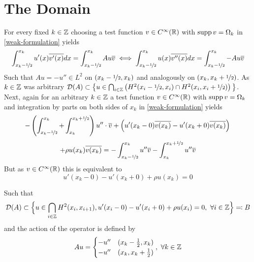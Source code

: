 \chapter{The Domain}

For every fixed $k \in \mathbb{Z}$ choosing a test function $v \in C^{\infty}(\mathbb{R})$ with $\operatorname{supp} v = \Omega_{k}$  in \eqref{weak-formulation} yields
	\[ \int_{x_{k}-\nicefrac{1}{2}}^{x_{k}} u'(x) \overline{v'(x)} dx = \int_{x_{k}-\nicefrac{1}{2}}^{x_{k}} A u \overline{v} \iff \int_{x_{k}-\nicefrac{1}{2}}^{x_{k}} u(x) \overline{v''(x)} dx = \int_{x_{k}-\nicefrac{1}{2}}^{x_{k}} - A u \overline{v} \]
Such that $A u = - u'' \in L^{2}$ on $(x_{k} -\nicefrac{1}{2}, x_{k})$ and analogously on $(x_{k}, x_{k} + \nicefrac{1}{2})$.
As $k \in \mathbb{Z}$ was arbitrary $\mathcal{D}(A) \subset \big\{ u \in \bigcap_{i \in \mathbb{Z}} \left( H^{2}(x_{i}-\nicefrac{1}{2}, x_{i}) \cap H^{2}(x_{i}, x_{i} + \nicefrac{1}{2}) \right)\big\}$. \\

Next, again for an arbitrary $k \in \mathbb{Z}$ a test function $v \in C^{\infty}(\mathbb{R})$ with $\operatorname{supp} v = \Omega_{k}$ and integration by parts on both sides of $x_{k}$ in \eqref{weak-formulation} yields
	\[ -\left( \int_{x_{k}-\nicefrac{1}{2}}^{x_{k}} + \int_{x_{k}}^{x_{k} + \nicefrac{1}{2}}\right) u'' \cdot \overline{v} + \left( u'(x_{k}-0) \overline{v(x_{k})} - u'(x_{k} + 0) \overline{v(x_{k})} \right) \\ \]
	\[ +  \rho u(x_{k})\overline{v(x_{k})} = - \int_{x_{k} - \nicefrac{1}{2}}^{x_{k}} u'' \overline{v} - \int_{x_{k}}^{x_{k} + \nicefrac{1}{2}} u'' \overline{v} \]
But as $v \in C^{\infty}(\mathbb{R})$ this is equivalent to
	\[ u'(x_{k}-0) - u'(x_{k}+0) + \rho u(x_{k}) = 0 \]
	
Such that
	\begin{align*}
		\mathcal{D}(A) \subset \Big\{ u \in \bigcap_{i \in \mathbb{Z}} H^{2}(x_{i}, x_{i + 1}), u'(x_{i} - 0) - u'(x_{i} + 0) + \rho u(x_{i}) = 0 , ~\forall i \in \mathbb{Z} \Big\} \eqqcolon B
	\end{align*} 
and the action of the operator is defined by
	\[ A u = \begin{cases}
					- u'' & (x_{k} - \frac{1}{2}, x_{k}) \\
					- u'' & (x_{k}, x_{k} + \frac{1}{2})
				\end{cases}, ~\forall k \in \mathbb{Z} \]
				
